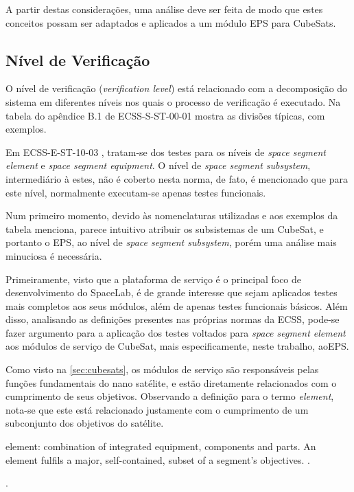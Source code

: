 A partir destas considerações, uma análise deve ser feita de modo que estes conceitos possam ser adaptados e aplicados a um módulo \gls{EPS} para CubeSats.


\subsection{Nível de Verificação} \label{sec:nivel-verificacao}


O nível de verificação (\textit{verification level}) está relacionado com a decomposição do sistema em diferentes níveis nos quais o processo de verificação é executado.
Na tabela do apêndice B.1 de ECSS-S-ST-00-01 \cite{ecss-s-st-00-01} mostra as divisões típicas, com exemplos.

Em ECSS-E-ST-10-03 \cite{ecss-e-st-10-03}, tratam-se dos testes para os níveis de \textit{space segment element} e \textit{space segment equipment}. O nível de \textit{space segment subsystem}, intermediário à estes, não é coberto nesta norma, de fato, é mencionado que para este nível, normalmente executam-se apenas testes funcionais.

Num primeiro momento, devido às nomenclaturas utilizadas e aos exemplos da tabela menciona, parece intuitivo atribuir os subsistemas de um CubeSat, e portanto o \gls{EPS}, ao nível de \textit{space segment subsystem}, porém uma análise mais minuciosa é necessária.

Primeiramente, visto que a plataforma de serviço é o principal foco de desenvolvimento do SpaceLab, é de grande interesse que sejam aplicados testes mais completos aos seus módulos, além de apenas testes funcionais básicos.
Além disso, analisando as definições presentes nas próprias normas da \gls{ECSS}, pode-se fazer argumento para a aplicação dos testes voltados para \textit{space segment element} aos módulos de serviço de CubeSat, mais especificamente, neste trabalho, ao\gls{EPS}.

Como visto na \autoref{sec:cubesats}, os módulos de serviço são responsáveis pelas funções fundamentais do nano satélite, e estão diretamente relacionados com o cumprimento de seus objetivos.
Observando a definição para o termo \textit{element}, nota-se que este está relacionado justamente com o cumprimento de um subconjunto dos objetivos do satélite.

\begin{citacao}
    element: combination of integrated equipment, components and parts. An element fulfils a major, self-contained, subset of a segment's objectives. \cite[p. 9]{ecss-s-st-00-01}.
\end{citacao}.

